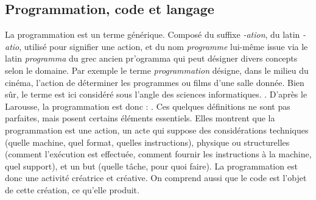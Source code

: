 \documentclass[12pt]{article} %
\begin{document}
\subsection{Programmation, code et langage}
La programmation est un terme générique. Composé du suffixe \textit{-ation}, du latin \textit{-atio}, utilisé pour signifier une action, et du nom \textit{programme} lui-même issue via le latin \textit{programma} du grec ancien \foreignlanguage{greek}{pr'ogramma} qui peut désigner divers concepts selon le domaine. Par exemple le terme \textit{programmation} désigne, dans le milieu du cinéma, l'action de déterminer les programmes ou films d'une salle donnée. Bien sûr, le terme est ici considéré sous l'angle des sciences informatiques.  \cite{Romero2017-mk}. D'après le Larousse, la programmation est donc : 
\cite{Nimmo2017-ya}. Ces quelques définitions ne sont pas parfaites, mais posent certains éléments essentiels. Elles montrent que la programmation est une action, un acte qui suppose des considérations techniques (quelle machine, quel format, quelles instructions), physique ou structurelles (comment l'exécution est effectuée, comment fournir les instructions à la machine, quel support), et un but (quelle tâche, pour quoi faire). La programmation est donc une activité créatrice et créative. On comprend aussi que le code est l'objet de cette création, ce qu'elle produit.
\end{document}
